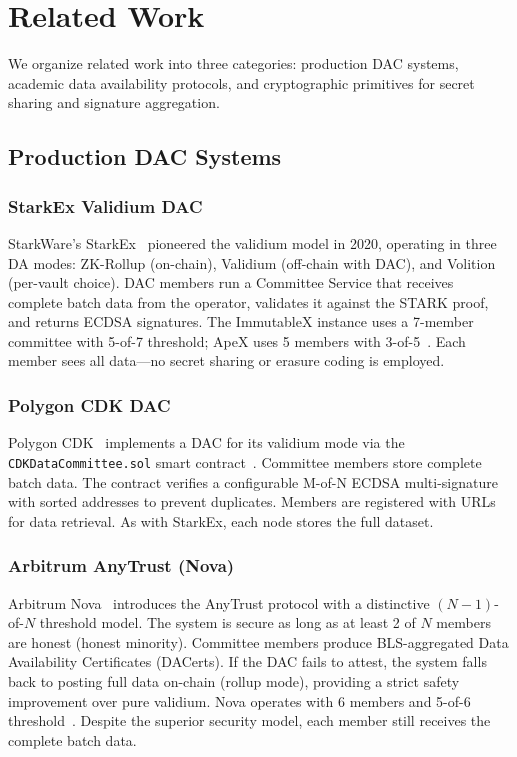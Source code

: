
\section{Related Work}

We organize related work into three categories: production DAC systems,
academic data availability protocols, and cryptographic primitives for
secret sharing and signature aggregation.

\subsection{Production DAC Systems}

\subsubsection{StarkEx Validium DAC}

StarkWare's StarkEx~\cite{starkware2024da} pioneered the validium model in
2020, operating in three DA modes: ZK-Rollup (on-chain), Validium (off-chain
with DAC), and Volition (per-vault choice). DAC members run a Committee
Service that receives complete batch data from the operator, validates it
against the STARK proof, and returns ECDSA signatures. The ImmutableX instance
uses a 7-member committee with 5-of-7 threshold; ApeX uses 5 members with
3-of-5~\cite{l2beat2024da}. Each member sees all data---no secret sharing or
erasure coding is employed.

\subsubsection{Polygon CDK DAC}

Polygon CDK~\cite{polygon2024cdk} implements a DAC for its validium mode via
the \texttt{CDKDataCommittee.sol} smart contract~\cite{polygon2024cdknode}.
Committee members store complete batch data. The contract verifies a
configurable M-of-N ECDSA multi-signature with sorted addresses to prevent
duplicates. Members are registered with URLs for data retrieval. As with
StarkEx, each node stores the full dataset.

\subsubsection{Arbitrum AnyTrust (Nova)}

Arbitrum Nova~\cite{arbitrum2024anytrust} introduces the AnyTrust protocol
with a distinctive $(N-1)$-of-$N$ threshold model. The system is secure as
long as at least 2 of $N$ members are honest (honest minority). Committee
members produce BLS-aggregated Data Availability Certificates (DACerts). If
the DAC fails to attest, the system falls back to posting full data on-chain
(rollup mode), providing a strict safety improvement over pure validium. Nova
operates with 6 members and 5-of-6 threshold~\cite{l2beat2024da}. Despite the
superior security model, each member still receives the complete batch data.

